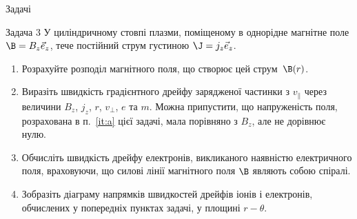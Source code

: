 \documentclass[]{beamer}
\begin{document}
\begin{frame}{Задачі}{}
	\begin{exampleblock}{Задача 3}
		У циліндричному стовпі плазми, поміщеному в однорідне магнітне поле $\B = B_z\vec{e}_z$, тече постійний струм густиною  $\J = j_z \vec{e}_z$.
		\begin{enumerate}
			\item\label{it:a}  Розрахуйте розподіл магнітного поля, що створює цей струм~$\B(r)$.
			\item Виразіть швидкість градієнтного дрейфу зарядженої частинки з $v_\parallel$ через величини $B_z$, $j_z$, $r$, $v_\perp$, $e$ та $m$. Можна припустити, що напруженість поля, розрахована в п.~\ref{it:a} цієї задачі, мала порівняно з $B_z$, але не дорівнює нулю.
			\item Обчисліть швидкість дрейфу електронів, викликаного наявністю електричного поля, враховуючи, що силові лінії магнітного поля $\B$ являють собою спіралі.
			\item Зобразіть діаграму напрямків швидкостей дрейфів іонів і електронів, обчислених у попередніх пунктах задачі, у площині $r - \theta$.
		\end{enumerate}
	\end{exampleblock}
\end{frame}
\end{document}
